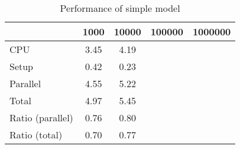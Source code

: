 \begin{table}[!h]
\centering
\caption{Performance of simple model}
\begin{tabular}{l*{2}{c}}\hline
& 1000 &           10000 &          100000 &         1000000 \\ \hline
CPU &     3.45 &      4.19 \\
Setup &     0.42 &      0.23 \\
Parallel &     4.55 &      5.22 \\
Total &     4.97 &      5.45 \\
Ratio (parallel) &     0.76 &      0.80 \\
Ratio (total) &     0.70 &      0.77 \\
\hline
\end{tabular}
\end{table}
